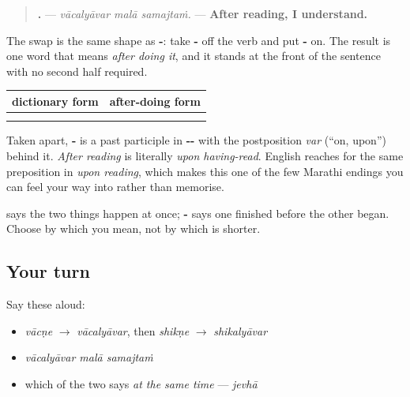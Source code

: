 \begin{grammarlens}[title={Grammar Lens: one ending instead of two clauses}]
\begin{quote}
\textbf{  .} — \emph{vācalyāvar malā samajtaṁ.} — \textbf{After reading, I understand.}
\end{quote}

The swap is the same shape as \textbf{-}: take \textbf{-} off the verb and put \textbf{-} on. The result is one word that means \emph{after doing it}, and it stands at the front of the sentence with no second half required.

\noindent
\begin{tabularx}{\linewidth}{@{}>{\raggedright\arraybackslash}X>{\raggedright\arraybackslash}X@{}}
\toprule
\textbf{dictionary form} & \textbf{after-doing form} \\
\midrule
\mr{वाचणे} & \mr{वाचल्यावर} \\
\mr{शिकणे} & \mr{शिकल्यावर} \\
\bottomrule
\end{tabularx}

Taken apart, \textbf{-} is a past participle in \textbf{--} with the postposition \emph{var} (\textquotedblleft{}on, upon\textquotedblright{}) behind it. \emph{After reading} is literally \emph{upon having-read}. English reaches for the same preposition in \emph{upon reading}, which makes this one of the few Marathi endings you can feel your way into rather than memorise.

\textbf{} says the two things happen at once; \textbf{-} says one finished before the other began. Choose by which you mean, not by which is shorter.
\end{grammarlens}

\subsection*{Your turn}
Say these aloud:

\begin{itemize}
\raggedright
  \item \emph{vācṇe} $\to$ \emph{vācalyāvar}, then \emph{shikṇe} $\to$ \emph{shikalyāvar}
  \item \emph{vācalyāvar malā samajtaṁ}
  \item which of the two says \emph{at the same time} — \emph{jevhā}
\end{itemize}

